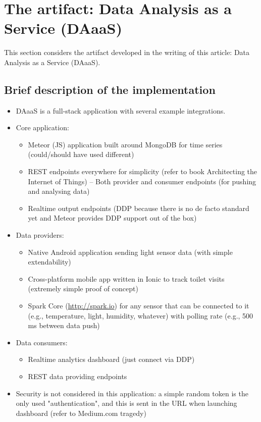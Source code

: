 \section{The artifact: Data Analysis as a Service (DAaaS)}
This section considers the artifact developed in the writing of this article: Data Analysis as a Service (DAaaS).
\subsection{Brief description of the implementation}
\begin{itemize}
    \item DAaaS is a full-stack application with several example integrations.
    \item Core application:
    \begin{itemize}
        \item Meteor (JS) application built around MongoDB for time series (could/should have used different)
        \item REST endpoints everywhere for simplicity (refer to book Architecting the Internet of Things) – Both provider and consumer endpoints (for pushing and analysing data)
        \item Realtime output endpoints (DDP because there is no de facto standard yet and Meteor provides DDP support out of the box)
    \end{itemize}
    \item Data providers:
    \begin{itemize}
        \item Native Android application sending light sensor data (with simple extendability)
        \item Cross-platform mobile app written in Ionic to track toilet visits (extremely simple proof of concept)
        \item Spark Core (\url{http://spark.io}) for any sensor that can be connected to it (e.g., temperature, light, humidity, whatever) with polling rate (e.g., 500 ms between data push)
    \end{itemize}
    \item Data consumers:
    \begin{itemize}
        \item Realtime analytics dashboard (just connect via DDP)
        \item REST data providing endpoints
    \end{itemize}
    \item Security is not considered in this application: a simple random token is the only used "authentication", and this is sent in the URL when launching dashboard (refer to Medium.com tragedy)
\end{itemize}
